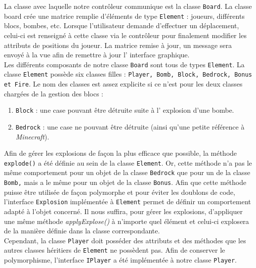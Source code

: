         La classe avec laquelle notre contrôleur communique est la classe 
        \texttt{Board}. La classe board crée une matrice remplie d'éléments 
        de type \texttt{Element} : joueurs, différents blocs, bombes, etc. 
        Lorsque l'utilisateur demande d'effectuer un déplacement, celui-ci 
        est renseigné à cette classe via le contr\^oleur pour finalement 
        modifier les attributs de positions du joueur. La matrice remise à 
        jour, un message sera envoyé à la vue afin de remettre à jour l'
        interface graphique.\\
        
        Les différents composants de notre classe \texttt{Board} sont tous 
        de types \texttt{Element}. La classe \texttt{Element} possède six 
        classes filles : \texttt{Player, Bomb, Block, Bedrock, Bonus et Fire}.
        Le 
        nom des classes est assez explicite si ce n'est pour les deux classes 
        chargées de la gestion des blocs :
        \begin{enumerate}
        \item \texttt{Block} : une case pouvant \^etre détruite suite à l'
        explosion d'une bombe.
        \item \texttt{Bedrock} : une case ne pouvant \^etre détruite (ainsi 
        qu'une petite référence à \textit{Minecraft}).
        \end{enumerate}
        
        Afin de gérer les explosions de façon la plus efficace que possible, 
        la méthode \texttt{explode()} a été définie au sein de la classe 
        \texttt{Element}. Or, cette méthode n'a pas le même comportement pour
        un objet de la classe \texttt{Bedrock} que pour un de la classe \texttt{Bomb,} 
        mais a le m\^eme pour un objet de la classe \texttt{Bonus}. 
        Afin que cette méthode puisse être utilisée de façon polymorphe et pour
        éviter les doublons de code, l'interface \texttt{Explosion} implémentée 
        à \texttt{Element} permet de définir un comportement adapté à l'objet
        concerné. Il nous suffira, pour gérer les explosions, d'appliquer une même méthode \textit{applyExplose()} à n’importe quel élément et celui-ci explosera de la manière définie dans la classe correspondante.\\
        
		Cependant, la classe \texttt{Player} doit posséder des attributs et 
		des méthodes que les autres classes héritiers de \texttt{Element} ne 
		possèdent pas. Afin de conserver le polymorphisme, l'interface 
		\texttt{IPlayer} a été implémentée à notre classe \texttt{Player}.
        
